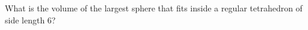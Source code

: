 What is the volume of the largest sphere that fits inside a regular tetrahedron of side length $6$?
